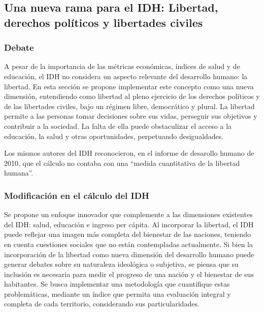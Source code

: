 \documentclass[
  10pt,
]{article}
\begin{document}
\subsection{Una nueva rama para el IDH: Libertad, derechos políticos y
libertades
civiles}\label{una-nueva-rama-para-el-idh-libertad-derechos-poluxedticos-y-libertades-civiles}

\subsubsection{Debate}\label{debate-2}

A pesar de la importancia de las métricas económicas, índices de salud y
de educación, el IDH no considera un aspecto relevante del desarrollo
humano: la libertad. En esta sección se propone implementar este
concepto como una nueva dimensión, entendiendo como libertad al pleno
ejercicio de los derechos políticos y de las libertades civiles, bajo un
régimen libre, democrático y plural. La libertad permite a las personas
tomar decisiones sobre sus vidas, perseguir sus objetivos y contribuir a
la sociedad. La falta de ella puede obstaculizar el acceso a la
educación, la salud y otras oportunidades, perpetuando desigualdades.

Los mismos autores del IDH reconocieron, en el informe de desarollo
humano de 2010, que el cálculo no contaba con una ``medida cuantitativa
de la libertad humana''.

\subsubsection{Modificación en el cálculo del
IDH}\label{modificaciuxf3n-en-el-cuxe1lculo-del-idh-2}

Se propone un enfoque innovador que complemente a las dimensiones
existentes del IDH: salud, educación e ingreso per cápita. Al incorporar
la libertad, el IDH puede reflejar una imagen más completa del bienestar
de las naciones, teniendo en cuenta cuestiones sociales que no están
contempladas actualmente. Si bien la incorporación de la libertad como
nueva dimensión del desarrollo humano puede generar debates sobre su
naturaleza ideológica o subjetiva, se piensa que su inclusión es
necesaria para medir el progreso de una nación y el bienestar de sus
habitantes. Se busca implementar una metodología que cuantifique estas
problemáticas, mediante un índice que permita una evaluación integral y
completa de cada territorio, considerando sus particularidades.
\end{document}
